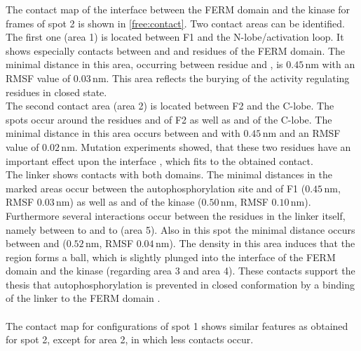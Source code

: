 %
%
%
The contact map of the interface between the FERM domain and the kinase for frames of spot 2 is shown in \autoref{free:contact}. Two contact areas can be identified. The first one (area 1) is located between F1 and the N-lobe/activation loop. It shows especially contacts between  and  and residues of the FERM domain. The minimal distance in this area, occurring between residue  and , is $0.45\,\si{\nano\metre}$ with an RMSF value of $0.03\,\si{\nano\metre}$. This area reflects the burying of the activity regulating residues in closed state.\\
The second contact area (area 2) is located between F2 and the C-lobe. The spots occur around the residues  and  of F2 as well as  and  of the C-lobe. The minimal distance in this area occurs between  and  with $0.45\,\si{\nano\metre}$ and an RMSF value of $0.02\,\si{\nano\metre}$. Mutation experiments showed, that these two residues have an important effect upon the interface \autocite{structFAK}, which fits to the obtained contact.\\
The linker shows contacts with both domains. The minimal distances in the marked areas occur between the autophosphorylation site  and  of F1 ($0.45\,\si{\nano\metre}$, RMSF $0.03\,\si{\nano\metre}$) as well as  and  of the kinase ($0.50\,\si{\nano\metre}$, RMSF $0.10\,\si{\nano\metre}$). Furthermore several interactions occur between the residues in the linker itself, namely between  to  and  to  (area 5). Also in this spot the minimal distance occurs between  and  ($0.52\,\si{\nano\metre}$, RMSF $0.04\,\si{\nano\metre}$). The density in this area induces that the region forms a ball, which is slightly plunged into the interface of the FERM domain and the kinase (regarding area 3 and area 4). These contacts support the thesis that autophosphorylation is prevented in closed conformation by a binding of the linker to the FERM domain \autocite{pap003}.\\
\\
The contact map for configurations of spot 1 shows similar features as obtained for spot 2, except for area 2, in which less contacts occur.
%
%
%
